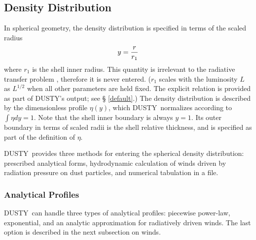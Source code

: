 \documentclass[12pt]{article} \usepackage{epsf}
\def\D  {{\sf DUSTY}}
\begin{document}
\subsection{Density Distribution}
\label{density}

In spherical geometry, the density distribution  is specified in terms of the
scaled radius
$$
                        y = {r \over r_1}
$$
where $r_1$ is the shell inner radius.  This quantity is irrelevant to the
radiative transfer problem \cite{IE97}, therefore it is never entered. ($r_1$
scales with the luminosity $L$ as $L^{1/2}$ when all other parameters are held
fixed. The explicit relation is provided as part of \D's output; see \S
\ref{default}.) The density distribution is described by the dimensionless
profile $\eta(y)$, which \D\ normalizes according to $\int\eta dy = 1$. Note
that the shell inner boundary is always $y = 1$.  Its outer boundary in terms
of scaled radii is the shell relative thickness, and is specified as part of
the definition of $\eta$.

\D\ provides three methods for entering the spherical density distribution:
prescribed analytical forms, hydrodynamic calculation of winds driven by
radiation pressure on dust particles, and numerical tabulation in a file.

\subsubsection          {Analytical Profiles}

\D\ can handle three types of analytical profiles: piecewise power-law,
exponential, and an analytic approximation for radiatively driven winds.  The
last option is described in the next subsection on winds.
\end{document}
